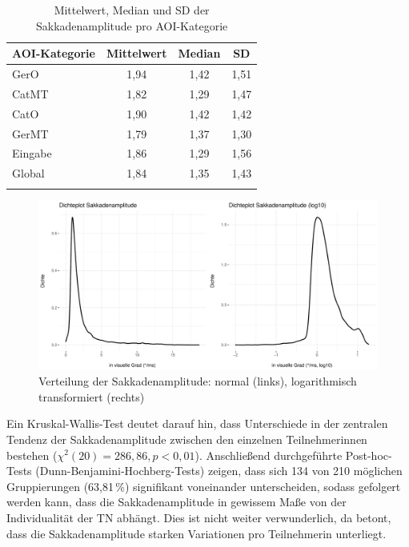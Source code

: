 \begin{table}
    \begin{tabular}{lccc}
    \lsptoprule
        {AOI-Kategorie} & {Mittelwert} & {Median} & {SD} \\ 
        \midrule
        GerO  & 1,94 & 1,42 & 1,51\\ 
        CatMT  & 1,82 & 1,29 & 1,47\\ 
        CatO   & 1,90 & 1,42 & 1,42\\ 
        GerMT  & 1,79 & 1,37 & 1,30\\ 
        Eingabe  & 1,86 & 1,29 & 1,56\\ 
        \midrule
        Global & 1,84 & 1,35 & 1,43\\ 
        \lspbottomrule
    \end{tabular}
        \caption[Mittelwert, Median und SD der Sakkadenamplitude]{Mittelwert, Median und SD der Sakkadenamplitude pro AOI-Kategorie}
    \label{K6:tab:CatDe:sacamp}
\end{table}





\begin{figure}
    \includegraphics[width=\textwidth]{Figures/EyeTracking/CatDe/ggplot_CatDe-SacAmp_density_de}
	\caption{Verteilung der Sakkadenamplitude: normal (links), logarithmisch transformiert (rechts)}
	\label{K6:fig:CatDe:sacamp-density}
\end{figure}


Ein Kruskal-Wallis-Test deutet darauf hin, dass Unterschiede in der zentralen Tendenz der Sakkadenamplitude zwischen den einzelnen Teilnehmer{\textperiodcentered}innen bestehen ($\chi^2(20) = 286,86, p < 0,01$). Anschließend durchgeführte Post-hoc-Tests (Dunn-Benjamini-Hochberg-Tests) zeigen, dass sich 134 von 210 möglichen Gruppierungen (63,81\,\%) signifikant voneinander unterscheiden, sodass gefolgert werden kann, dass die Sakkadenamplitude in gewissem Maße von der Individualität der TN abhängt. Dies ist nicht weiter verwunderlich, da \citet[312]{holmqvist_eye_2011} betont, dass die Sakkadenamplitude starken Variationen pro Teilnehmer{\textperiodcentered}in unterliegt.

